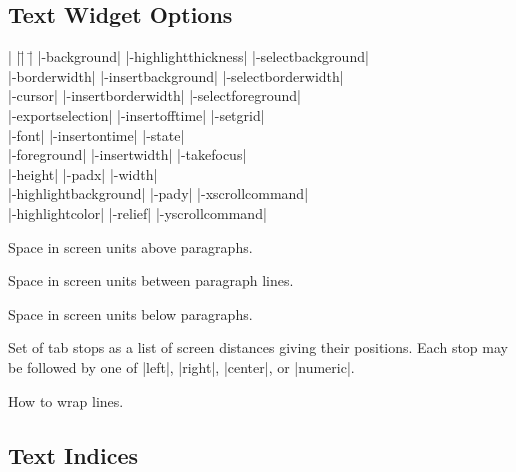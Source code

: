 \subsection*{Text Widget Options}
\begin{tabbing}
|                    |\=|                    |\= \kill
|-background|         \> |-highlightthickness| \> |-selectbackground| \\
|-borderwidth|        \> |-insertbackground|   \> |-selectborderwidth| \\
|-cursor|	      \> |-insertborderwidth|  \> |-selectforeground| \\
|-exportselection|    \> |-insertofftime|      \> |-setgrid| \\
|-font|               \> |-insertontime|       \> |-state| \\
|-foreground|         \> |-insertwidth|        \> |-takefocus| \\
|-height|             \> |-padx|               \> |-width| \\         
|-highlightbackground|\> |-pady|               \> |-xscrollcommand| \\
|-highlightcolor|     \> |-relief| 	       \> |-yscrollcommand| \\
\end{tabbing}

\vskip5pt
\begin{enum}{4.7cm}

 Space in screen units above paragraphs.

 Space in screen units between paragraph lines.

 Space in screen units below paragraphs.

\end{enum}
\begin{enum}{1cm}
 Set of tab stops as a list of screen
distances giving their positions. Each stop may be followed
by one of |left|, |right|, |center|, or |numeric|.
\end{enum}
\begin{enum}{5cm}

 How to wrap lines.

\end{enum}

\subsection*{Text Indices}

